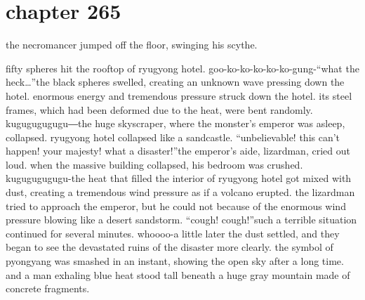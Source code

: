 \section{chapter 265}

                            the necromancer jumped off the floor, swinging his scythe.





fifty spheres hit the rooftop of ryugyong hotel.
goo-ko-ko-ko-ko-ko-gung-“what the heck…”the black spheres swelled, creating an unknown wave pressing down the hotel.
 enormous energy and tremendous pressure struck down the hotel.
its steel frames, which had been deformed due to the heat, were bent randomly.
kugugugugugu―the huge skyscraper, where the monster’s emperor was asleep, collapsed.
ryugyong hotel collapsed like a sandcastle.
“unbelievable! this can’t happen! your majesty! what a disaster!”the emperor’s aide, lizardman, cried out loud.
 when the massive building collapsed, his bedroom was crushed.
kugugugugugu-the heat that filled the interior of ryugyong hotel got mixed with dust, creating a tremendous wind pressure as if a volcano erupted.
the lizardman tried to approach the emperor, but he could not because of the enormous wind pressure blowing like a desert sandstorm.
“cough! cough!”such a terrible situation continued for several minutes.
whoooo-a little later the dust settled, and they began to see the devastated ruins of the disaster more clearly.
 the symbol of pyongyang was smashed in an instant, showing the open sky after a long time.
and a man exhaling blue heat stood tall beneath a huge gray mountain made of concrete fragments.

